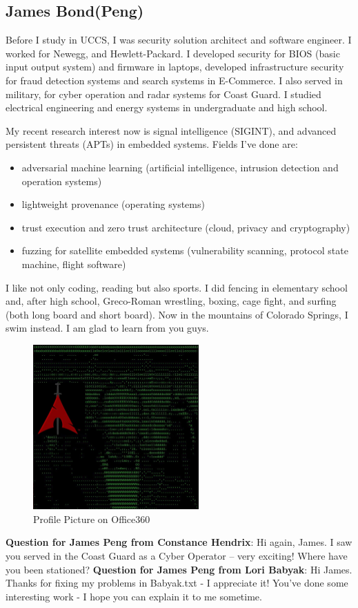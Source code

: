 \subsection{James Bond(Peng)}
Before I study in UCCS, I was security solution architect and software engineer. I worked for Newegg, and Hewlett-Packard. I developed security for BIOS (basic input output system) and firmware in laptops, developed infrastructure security for fraud detection systems and search systems in E-Commerce. I also served in military, for cyber operation and radar systems for Coast Guard. I studied electrical engineering and energy systems in undergraduate and high school.

My recent research interest now is signal intelligence (SIGINT), and advanced persistent threats (APTs) in embedded systems. Fields I've done are: 

\begin{itemize}
\item adversarial machine learning (artificial intelligence, intrusion detection and operation systems)
\item lightweight provenance (operating systems)
\item trust execution and zero trust architecture (cloud, privacy and cryptography)
\item fuzzing for satellite embedded systems (vulnerability scanning, protocol state machine, flight software)
\end{itemize}

I like not only coding, reading but also sports. I did fencing in elementary school and, after high school, Greco-Roman wrestling, boxing, cage fight, and surfing (both long board and short board). Now in the mountains of Colorado Springs, I swim instead. I am glad to learn from you guys. 

\begin{figure}[h]
  \centering
  \includegraphics[width=180pt]{flainggg.jpg}
  \caption{Profile Picture on Office360}
  \label{fig.q1a}
\end{figure}

\textbf{Question for James Peng from Constance Hendrix}:  Hi again, James.  I saw you served in the Coast Guard as a Cyber Operator -- very exciting!  Where have you been stationed?
\textbf{Question for James Peng from Lori Babyak}:  Hi James. Thanks for fixing my problems in Babyak.txt - I appreciate it!  You've done some interesting work - I hope you can explain it to me sometime.
